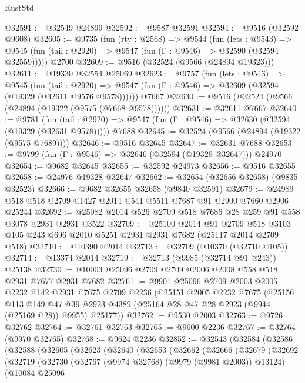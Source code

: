 \begin{lexlean}{RustStd}
\begin{coremodule}
@32591 := @32549 @24899
@32592 := @9587 @32591
@32594 := @9516 (@32592 @9608)
@32605 := @9735
    (fun (rty : @2568) =>
    @9544
      (fun (lets : @9543) =>
      @9545 (fun (tail : @2920) => @9547 (fun (Γ : @9546) => @32590 (@32594 @32559)))))
    @2700
@32609 := @9516 (@32524 (@9566 (@24894 @19323)))
@32611 := @19330 @32554 @25069
@32623 := @9757
    (fun (lets : @9543) =>
    @9545
      (fun (tail : @2920) =>
      @9547 (fun (Γ : @9546) => @32609 (@32594 (@19329 (@32611 @9576 @9578))))))
    @7667
@32630 := @9516 (@32524 (@9566 (@24894 (@19322 (@9575 (@7668 @9578))))))
@32631 := @32611 @7667
@32640 := @9781
    (fun (tail : @2920) => @9547 (fun (Γ : @9546) => @32630 (@32594 (@19329 (@32631 @9578)))))
    @7688
@32645 := @32524 (@9566 (@24894 (@19322 (@9575 @7689))))
@32646 := @9516 @32645
@32647 := @32631 @7688
@32653 := @9799 (fun (Γ : @9546) => @32646 (@32594 (@19329 @32647))) @24970
@32654 := @9682 @32645
@32655 := @32592 @24973
@32656 := @9516 @32655
@32658 := @24976 @19328 @32647
@32662 := @32654 (@32656 @32658) (@9835 @32523)
@32666 := @9682 @32655 @32658 (@9840 @32591)
@32679 := @24989 @518 @518 @2709 @1427 @2014 @541 @5511 @7687 @91 @2900 @7660 @2906 @25244
@32692 := @25082 @2014 @526 @2709 @518 @7686 @28 @259 @91 @558 @3078 @2931 @2931 @3522
@32709 := @25100
    @2014
    @91
    @2709
    @518
    @3103
    @105
    @243
    @696
    @2010
    @5251
    @2931
    @2931
    @7682
    (@25117 @2014 @2709 @518)
@32710 := @10390 @2014
@32713 := @32709 (@10370 (@32710 @105))
@32714 := @13374 @2014
@32719 := @32713 (@9985 (@32714 @91 @243)) @25138
@32730 := @10003 @25096 @2709 @2709 @2006 @2008 @558 @518 @2931 @7677 @2931 @7682
@32761 := @9901
    @25096
    @2709
    @2003
    @2005
    @2232
    @142
    @2931
    @7675
    @2709
    @2236
    (@25151
      @2005
      @2232
      @7675
      (@25156
        @113
        @149
        @47
        @39
        @2923
        @4389
        (@25164 @28 @47 @28 @2923 (@9944 (@25169 @28)) @9955)
        @25177))
@32762 := @9530 @2003
@32763 := @9726 @32762
@32764 := @32761 @32763
@32765 := @9600 @2236
@32767 := @32764 (@9970 @32765)
@32768 := @9624 @2236
@32852 := @32543
    (@32584
      (@32586
        (@32588
          (@32605
            (@32623
              (@32640
                (@32653
                  (@32662
                    (@32666
                      (@32679
                        (@32692
                          (@32719
                            (@32730
                              (@32767 (@9974 @32768) (@9979 (@9981 @2003)) @13124)
                              (@10084
                                @25096

\end{coremodule}
\end{lexlean}

